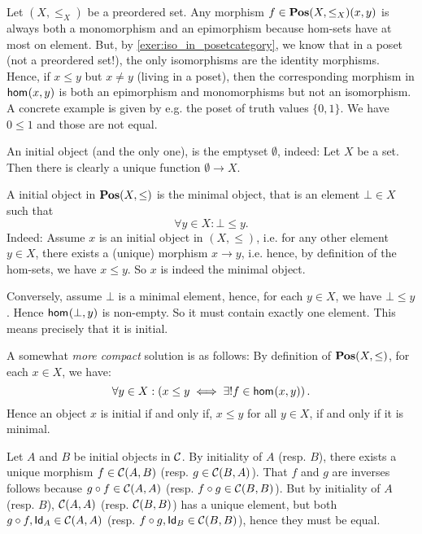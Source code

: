 \begin{solution}\label{sol:counterexample_monoepi_not_iso}
Let $(X,\leq_X)$ be a preordered set. Any morphism $f \in \POS(X,\leq_X)(x,y)$ is always both a monomorphism and an epimorphism because hom-sets have at most on element. But, by \cref{exer:iso_in_posetcategory}, we know that in a poset (not a preordered set!), the only isomorphisms are the identity morphisms. Hence, if $x\leq y$ but $x\not=y$ (living in a poset), then the corresponding morphism in $\Hom{x}{y}$ is both an epimorphism and monomorphisms but not an isomorphism.\\
A concrete example is given by e.g. the poset of truth values $\{0, 1\}$. We have $0\leq 1$ and those are not equal.
\end{solution}

\begin{solution} \label{sol:initial_set}
An initial object (and the only one), is the emptyset $\emptyset$, indeed: Let $X$ be a set. Then there is clearly a unique function $\emptyset\to X$.
\end{solution}

\begin{solution}\label{sol:initial_posetcat}
A initial object in $\POS(X,\leq)$ is the minimal object, that is an element $\bot\in X$ such that
\begin{equation}
\forall y\in X: \bot \leq y.
\end{equation}
Indeed: Assume $x$ is an initial object in $(X,\leq)$, i.e. for any other element $y\in X$, there exists a (unique) morphism $x\to y$, i.e. hence, by definition of the hom-sets, we have $x\leq y$. So $x$ is indeed the minimal object.

Conversely, assume $\bot$ is a minimal element, hence, for each $y\in X$, we have $\bot\leq y$. Hence $\Hom{\bot}{y}$ is non-empty. So it must contain exactly one element. This means precisely that it is initial.


A somewhat \textit{more compact} solution is as follows: By definition of $\POS(X,\leq)$, for each $x\in X$, we have:
\[
\forall y\in X: \left(x\leq y \iff \exists! f\in \Hom{x}{y}\right).
\]
Hence an object $x$ is initial if and only if, $x\leq y$ for all $y\in X$, if and only if it is minimal.
\end{solution}

\begin{solution}\label{sol:initial-unique}
Let $A$ and $B$ be initial objects in $\CC$. By initiality of $A$ (resp. $B$), there exists a unique morphism $f \in \CHom{\CC}{A}{B}$ (resp. $g \in \CHom{\CC}{B}{A}$). That $f$ and $g$ are inverses follows because $\co{f}{g} \in \CHom{\CC}{A}{A}$ (resp. $\co{g}{f}\in \CHom{\CC}{B}{B}$). But by initiality of $A$ (resp. $B$), $\CHom{\CC}{A}{A}$ (resp. $\CHom{\CC}{B}{B}$) has a unique element, but both $\co{f}{g}, \Id[A] \in \CHom{\CC}{A}{A}$ (resp. $\co{g}{f}, \Id[B] \in \CHom{\CC}{B}{B}$), hence they must be equal.
\end{solution}

